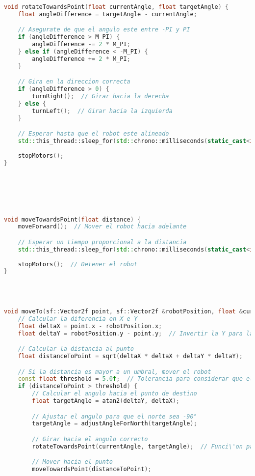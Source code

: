 \begin{lstlisting}[language={C++}, caption={Primer ajuste de c\'odigo}, label={Script}]
void rotateTowardsPoint(float currentAngle, float targetAngle) {
    float angleDifference = targetAngle - currentAngle;

    // Asegurate de que el angulo este entre -PI y PI
    if (angleDifference > M_PI) {
        angleDifference -= 2 * M_PI;
    } else if (angleDifference < -M_PI) {
        angleDifference += 2 * M_PI;
    }

    // Gira en la direccion correcta
    if (angleDifference > 0) {
        turnRight();  // Girar hacia la derecha
    } else {
        turnLeft();  // Girar hacia la izquierda
    }

    // Esperar hasta que el robot este alineado
    std::this_thread::sleep_for(std::chrono::milliseconds(static_cast<int>(std::fabs(angleDifference) * 1000)));
    
    stopMotors();
}






void moveTowardsPoint(float distance) {
    moveForward();  // Mover el robot hacia adelante

    // Esperar un tiempo proporcional a la distancia
    std::this_thread::sleep_for(std::chrono::milliseconds(static_cast<int>(distance * 1000)));
    
    stopMotors();  // Detener el robot
}




void moveTo(sf::Vector2f point, sf::Vector2f &robotPosition, float &currentAngle) {
    // Calcular la diferencia en X e Y
    float deltaX = point.x - robotPosition.x;
    float deltaY = robotPosition.y - point.y;  // Invertir la Y para la pantalla

    // Calcular la distancia al punto
    float distanceToPoint = sqrt(deltaX * deltaX + deltaY * deltaY);

    // Si la distancia es mayor a un umbral, mover el robot
    const float threshold = 5.0f;  // Tolerancia para considerar que el punto ha sido alcanzado
    if (distanceToPoint > threshold) {
        // Calcular el angulo hacia el punto de destino
        float targetAngle = atan2(deltaY, deltaX);

        // Ajustar el angulo para que el norte sea -90°
        targetAngle = adjustAngleForNorth(targetAngle);

        // Girar hacia el angulo correcto
        rotateTowardsPoint(currentAngle, targetAngle);  // Funci\'on para girar hacia el \'angulo

        // Mover hacia el punto
        moveTowardsPoint(distanceToPoint);
        

\end{lstlisting}
